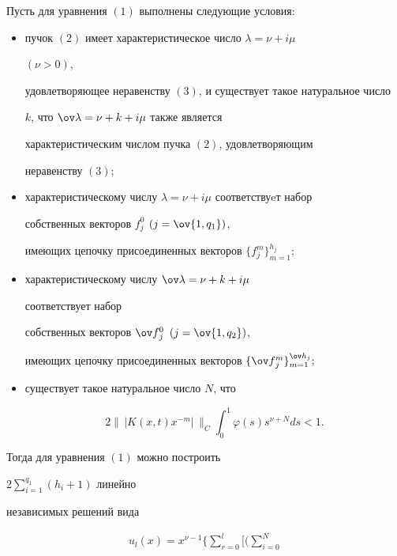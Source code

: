 \begin{thmnonum}


Пусть для уравнения $(1)$ выполнены следующие условия\/${:}$


\begin{itemize}


\item[1)] пучок $(2)$ имеет характеристическое число $\lambda=\nu+i\mu$


$(\nu>0)$, 


удовлетворяющее неравенству $(3)$, и существует такое натуральное число 


$k$, что $\ov\lambda=\nu+k+i\mu$ также является 


характеристическим числом пучка $(2)$, удовлетворяющим 


неравенству $(3);$


\item[2)] характеристическому числу $\lambda=\nu+i\mu$ соответствуeт набор 


собственных векторов $f^0_j$ $(j=\ov{1,q_1})$,


имеющих цепочку присоединенных векторов $\{f^m_j\}^{h_j}_{m=1};$


\item[3)] характеристическому числу $\ov\lambda=\nu+k+i\mu$


соответствует набор 


собственных векторов $\ov f{}^0_j$ $(j=\ov{1,q_2})$,


имеющих цепочку присоединенных векторов $\{\ov f{}^m_j\}^{\ov h_j}_{m=1};$


\item[4)] существует такое натуральное число $N$, что 


$$


2\big\|\,|K(x,t)x^{-m}|\,\big\|_C\int^1_0


\varphi(s)s^{\nu+N}ds<1.


$$


\end{itemize}





Тогда для уравнения $(1)$ можно построить


$2\sum\limits^{q_1}_{i=1}(h_i+1)$ линейно 


независимых решений вида


\begin{gather*} 


u_l(x)=x^{\nu-1}\bigg\{\sum^l_{r=0}\bigg[\bigg(\sum^N_{i=0}



\end{gather*}
\end{thmnonum}

